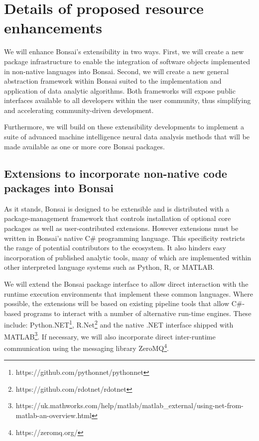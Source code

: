 

\section{Details of proposed resource enhancements}

We will enhance Bonsai's extensibility in two ways.
%
First, we will create a new package infrastructure to enable the integration of software objects implemented in non-native languages into Bonsai.
%
Second, we will create a new general abstraction framework within Bonsai suited to the implementation and application of data analytic algorithms.
%
Both frameworks will expose public interfaces available to all developers within the user community, thus simplifying and accelerating community-driven development.

Furthermore, we will build on these extensibility developments to implement a suite of advanced machine intelligence neural data analysis methods that will be made available as one or more core Bonsai packages.

\subsection{Extensions to incorporate non-native code packages into Bonsai}

As it stands, Bonsai is designed to be extensible and is distributed with a package-management framework that controls installation of optional core packages as well as user-contributed extensions.
%
However extensions must be written in Bonsai's native C\# programming language.
%
This specificity restricts the range of potential contributors to the ecosystem.
%
It also hinders easy incorporation of published analytic tools, many of which are implemented within other interpreted language systems such as Python, R, or MATLAB.  

We will extend the Bonsai package interface to allow direct interaction with the runtime execution environments that implement these common languages.  
%
Where possible, the extensions will be based on existing pipeline tools that allow C\#-based programs to interact with a number of alternative run-time engines.
%
These include:
%
Python.NET\footnote{https://github.com/pythonnet/pythonnet},
%
R.Net\footnote{https://github.com/rdotnet/rdotnet}
%
and the native .NET interface shipped with MATLAB\footnote{https://uk.mathworks.com/help/matlab/matlab\_external/using-net-from-matlab-an-overview.html}.
%
If necessary, we will also incorporate direct inter-runtime communication using the messaging library ZeroMQ\footnote{https://zeromq.org/}.

